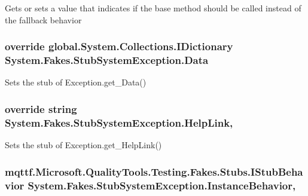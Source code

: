 Gets or sets a value that indicates if the base method should be called instead of the fallback behavior

\hypertarget{class_system_1_1_fakes_1_1_stub_system_exception_a71f944d1eeab86083e6eb84fe57691f9}{
\subsubsection[{Data}]{\setlength{\rightskip}{0pt plus 5cm}override global.\-System.\-Collections.\-I\-Dictionary System.\-Fakes.\-Stub\-System\-Exception.\-Data\hspace{0.3cm}{\ttfamily [get]}}}\label{class_system_1_1_fakes_1_1_stub_system_exception_a71f944d1eeab86083e6eb84fe57691f9}


Sets the stub of Exception.\-get\-\_\-\-Data()

\hypertarget{class_system_1_1_fakes_1_1_stub_system_exception_aacbd719a6bb5e4431efc43a542f342a2}{
\subsubsection[{Help\-Link}]{\setlength{\rightskip}{0pt plus 5cm}override string System.\-Fakes.\-Stub\-System\-Exception.\-Help\-Link\hspace{0.3cm}{\ttfamily [get]}, {\ttfamily [set]}}}\label{class_system_1_1_fakes_1_1_stub_system_exception_aacbd719a6bb5e4431efc43a542f342a2}


Sets the stub of Exception.\-get\-\_\-\-Help\-Link()

\hypertarget{class_system_1_1_fakes_1_1_stub_system_exception_a52d3c86b209101f512e184af63775df9}{
\subsubsection[{Instance\-Behavior}]{\setlength{\rightskip}{0pt plus 5cm}mqttf.\-Microsoft.\-Quality\-Tools.\-Testing.\-Fakes.\-Stubs.\-I\-Stub\-Behavior System.\-Fakes.\-Stub\-System\-Exception.\-Instance\-Behavior\hspace{0.3cm}{\ttfamily [get]}, {\ttfamily [set]}}}\label{class_system_1_1_fakes_1_1_stub_system_exception_a52d3c86b209101f512e184af63775df9}


